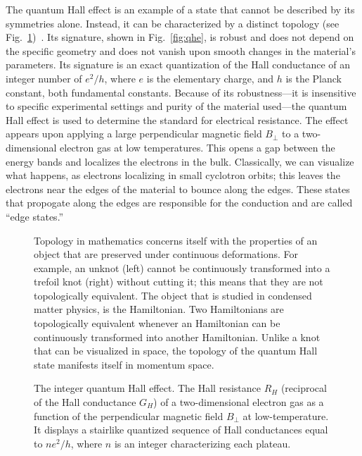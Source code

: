 The quantum Hall effect is an example of a state that cannot be described by its symmetries alone. Instead, it can be characterized by a distinct topology (see Fig.~\ref{fig:knots})~\cite{Avron2003}.
Its signature, shown in Fig.~\ref{fig:qhe}, is robust and does not depend on the specific geometry and does not vanish upon smooth changes in the material's parameters.
Its signature is an exact quantization of the Hall conductance of an integer number of $e^2/h$, where $e$ is the elementary charge, and $h$ is the Planck constant, both fundamental constants.
Because of its robustness---it is insensitive to specific experimental settings and purity of the material used---the quantum Hall effect is used to determine the standard for electrical resistance\cite{Jeckelmann2001}.
The effect appears upon applying a large perpendicular magnetic field $B_\perp$ to a two-dimensional electron gas at low temperatures.
This opens a gap between the energy bands and localizes the electrons in the bulk.
Classically, we can visualize what happens, as electrons localizing in small cyclotron orbits; this leaves the electrons near the edges of the material to bounce along the edges.
These states that propogate along the edges are responsible for the conduction and are called ``edge states.''

\begin{figure}[!htb]
\begin{center}
\caption{
Topology in mathematics concerns itself with the properties of an object that are preserved under continuous deformations.
For example, an unknot (left) cannot be continuously transformed into a trefoil knot (right) without cutting it; this means that they are not topologically equivalent.
The object that is studied in condensed matter physics, is the Hamiltonian.
Two Hamiltonians are topologically equivalent whenever an Hamiltonian can be continuously transformed into another Hamiltonian.
Unlike a knot that can be visualized in space, the topology of the quantum Hall state manifests itself in momentum space.
\label{fig:knots}}
\end{center}
\end{figure}

\begin{figure}[!htb]
\begin{center}
\caption{
The integer quantum Hall effect.
The Hall resistance $R_H$ (reciprocal of the Hall conductance $G_H$) of a two-dimensional electron gas as a function of the perpendicular magnetic field $B_\perp$ at low-temperature.
It displays a stairlike quantized sequence of Hall conductances equal to $ne^2/h$, where $n$ is an integer characterizing each plateau.
\label{fig:qhe_example}}
\end{center}
\end{figure}

